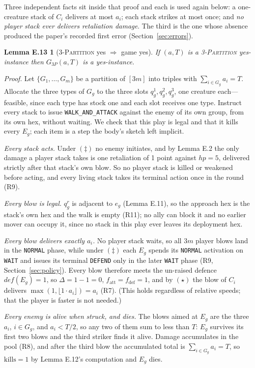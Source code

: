 \documentclass[11pt,a4paper]{article}
\theoremstyle{plain}
\newtheorem*{lemEyestwo}{Lemma E.13}
\theoremstyle{definition}
\theoremstyle{plain}
\theoremstyle{definition}
\theoremstyle{remark}
\newcommand{\THREEPART}{\textsc{3-Partition}}
\begin{document}
\smallskip
Three independent facts sit inside that proof and each is used again below: a one-creature
stack of $C_i$ delivers at most $a_i$; each stack strikes at most once; and \emph{no player
stack ever delivers retaliation damage}. The third is the one whose absence produced the
paper's recorded first error (Section~\ref{sec:errors}).

\begin{lemEyestwo}[\THREEPART{} yes $\Longrightarrow$ game yes]
If $(a,T)$ is a \THREEPART{} yes-instance then $G_{3P}(a,T)$ is a yes-instance.
\end{lemEyestwo}

\noindent\emph{Proof.} Let $\{G_1,\dots,G_m\}$ be a partition of $[3m]$ into triples with
$\sum_{i\in G_g}a_i=T$. Allocate the three types of $G_g$ to the three slots
$q_g^1,q_g^2,q_g^3$, one creature each---feasible, since each type has stock one and each
slot receives one type. Instruct every stack to issue \texttt{WALK\_AND\_ATTACK} against the
enemy of its own group, from its own hex, without waiting. We check that this play is legal
and that it kills every $E_g$; each item is a step the body's sketch left implicit.

\emph{Every stack acts.} Under $(\ddagger)$ no enemy initiates, and by Lemma E.2 the only
damage a player stack takes is one retaliation of 1 point against $\mathit{hp}=5$, delivered
strictly after that stack's own blow. So no player stack is killed or weakened before acting,
and every living stack takes its terminal action once in the round (R9).

\emph{Every blow is legal.} $q_g^r$ is adjacent to $e_g$ (Lemma E.11), so the approach hex is
the stack's own hex and the walk is empty (R11); no ally can block it and no earlier mover can
occupy it, since no stack in this play ever leaves its deployment hex.

\emph{Every blow delivers exactly $a_i$.} No player stack waits, so all $3m$ player blows land
in the \texttt{NORMAL} phase, while under $(\ddagger)$ each $E_g$ spends its \texttt{NORMAL}
activation on \texttt{WAIT} and issues its terminal \texttt{DEFEND} only in the later
\texttt{WAIT} phase (R9, Section~\ref{sec:policy}). Every blow therefore meets the un-raised
defence $\mathit{def}(E_g)=1$, so $\Delta=1-1=0$, $f_{\mathrm{att}}=f_{\mathrm{def}}=1$, and
by $(\star)$ the blow of $C_i$ delivers $\max(1,\lfloor 1\cdot a_i\rfloor)=a_i$ (R7). (This
holds regardless of relative speeds; that the player is faster is not needed.)

\emph{Every enemy is alive when struck, and dies.} The blows aimed at $E_g$ are the three
$a_i$, $i\in G_g$, and $a_i<T/2$, so any two of them sum to less than $T$: $E_g$ survives its
first two blows and the third striker finds it alive. Damage accumulates in the pool (R8), and
after the third blow the accumulated total is $\sum_{i\in G_g}a_i=T$, so
$\mathrm{kills}=1$ by Lemma E.12's computation and $E_g$ dies.
\end{document}
